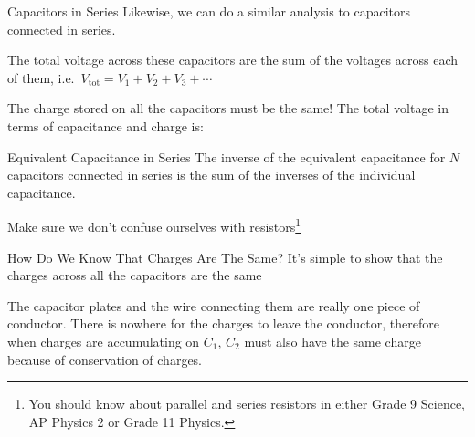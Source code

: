\documentclass[12pt,aspectratio=169]{beamer}
\begin{document}
\begin{frame}{Capacitors in Series}
  Likewise, we can do a similar analysis to capacitors connected in series.
  \begin{center}
  \end{center}
  The total voltage across these capacitors are the sum of the voltages across
  each of them, i.e.\ $V_\text{tot}=V_1+V_2+V_3+\cdots$
  
  \vspace{.1in}The charge stored on all the capacitors must be the same! The
  total voltage in terms of capacitance and charge is:

\end{frame}




\begin{frame}{Equivalent Capacitance in Series}
  The inverse of the equivalent capacitance for $N$ capacitors connected in
  series is the sum of the inverses of the individual capacitance.

  
  Make sure we don't confuse ourselves with resistors\footnote{You should know
  about parallel and series resistors in either Grade 9 Science, AP Physics 2
  or Grade 11 Physics.}
\end{frame}



\begin{frame}{How Do We Know That Charges Are The Same?}
  It's simple to show that the charges across all the capacitors are the same
  \begin{center}
  \end{center}
  The capacitor plates and the wire connecting them are really one piece of
  conductor. There is nowhere for the charges to leave the conductor, therefore
  when charges are accumulating on $C_1$, $C_2$ must also have the same charge
  because of conservation of charges.
\end{frame}
\end{document}
